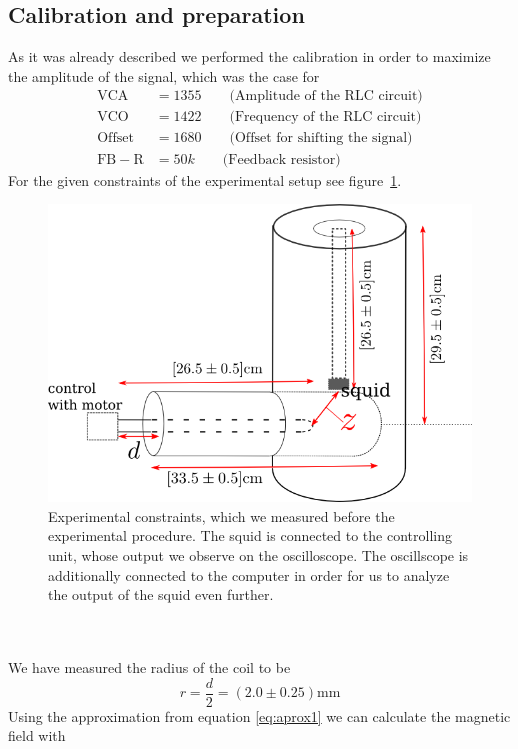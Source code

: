 \subsection{Calibration and preparation}
As it was already described we performed the calibration in order to maximize the amplitude of the
signal, which was the case for \\
\begin{align*}
     \mathrm{VCA} &= 1355 \qquad \text{(Amplitude of the RLC circuit)}\\
     \mathrm{VCO} &= 1422 \qquad\text{(Frequency of the RLC circuit)}\\ 
     \mathrm{Offset} &= 1680 \qquad\text{(Offset for shifting the signal)}\\
     \mathrm{FB-R} &= 50 k \qquad \text{(Feedback resistor)}
\end{align*}
For the given constraints of the experimental setup see figure~\ref{fig:setup1}.
\begin{figure}[htpb]
    \centering
    \includegraphics[width=0.8\linewidth]{figures/setup1}
    \caption{Experimental constraints, which we measured before the experimental procedure. The squid
    is connected to the controlling unit, whose output we observe on the oscilloscope. The oscillscope
    is additionally connected to the computer in order for us to analyze the output of the squid even further.}
    \label{fig:setup1}
\end{figure}
\\\\
We have measured the radius of the coil to be 
\begin{equation}
r = \frac{d}{2} = (2.0 \pm 0.25) \mathrm{mm}
\end{equation}
Using the approximation from equation \eqref{eq:aprox1} we can calculate the
magnetic field with 
